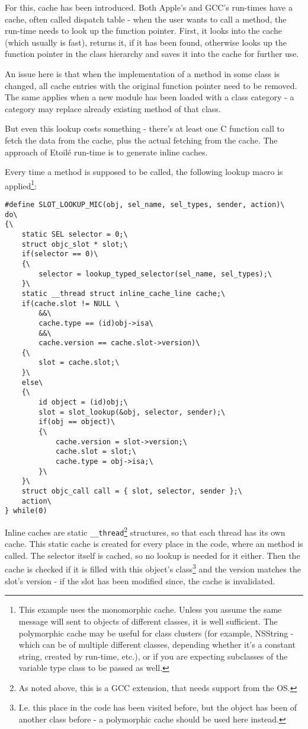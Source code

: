 For this, cache has been introduced. Both Apple's and GCC's run-times have a cache, often called dispatch table - when the user wants to call a method, the run-time needs to look up the function pointer. First, it looks into the cache (which usually is fast), returns it, if it has been found, otherwise looks up the function pointer in the class hierarchy and saves it into the cache for further use.

An issue here is that when the implementation of a method in some class is changed, all cache entries with the original function pointer need to be removed. The same applies when a new module has been loaded with a class category - a category may replace already existing method of that class.

But even this lookup costs something - there's at least one C function call to fetch the data from the cache, plus the actual fetching from the cache. The approach of Etoil\'e run-time is to generate inline caches.

Every time a method is supposed to be called, the following lookup macro is applied\footnote{This example uses the monomorphic cache. Unless you assume the same message will sent to objects of different classes, it is well sufficient. The polymorphic cache may be useful for class clusters (for example, NSString - which can be of multiple different classes, depending whether it's a constant string, created by run-time, etc.), or if you are expecting subclasses of the variable type class to be passed as well. }:

\begin{verbatim}
#define SLOT_LOOKUP_MIC(obj, sel_name, sel_types, sender, action)\
do\
{\
    static SEL selector = 0;\
    struct objc_slot * slot;\
    if(selector == 0)\
    {\
        selector = lookup_typed_selector(sel_name, sel_types);\
    }\
    static __thread struct inline_cache_line cache;\
    if(cache.slot != NULL \
        &&\
        cache.type == (id)obj->isa\
        &&\
        cache.version == cache.slot->version)\
    {\
        slot = cache.slot;\
    }\
    else\
    {\
        id object = (id)obj;\
        slot = slot_lookup(&obj, selector, sender);\
        if(obj == object)\
        {\
            cache.version = slot->version;\
            cache.slot = slot;\
            cache.type = obj->isa;\
        }\
    }\
    struct objc_call call = { slot, selector, sender };\
    action\
} while(0)
\end{verbatim}


Inline caches are static \verb=__thread=\footnote{As noted above, this is a GCC extension, that needs support from the OS.} structures, so that each thread has its own cache. This static cache is created for every place in the code, where an method is called. The selector itself is cached, so no lookup is needed for it either. Then the cache is checked if it is filled with this object's class\footnote{I.e. this place in the code has been visited before, but the object has been of another class before - a polymorphic cache should be used here instead.} and the version matches the slot's version - if the slot has been modified since, the cache is invalidated.

